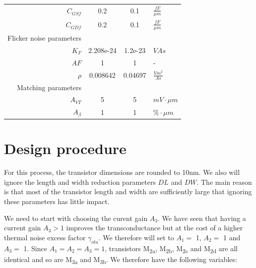 \documentclass[
  a4paper,
  DIV=11,
  numbers=noendperiod]{scrreprt}
\begin{document}
\begin{longtable}[]{@{}rccl@{}}
\(C_{{GSf}}\) & 0.2 & 0.1 & \(\frac{{fF}}{{\mu m}}\) \\
\(C_{{GDf}}\) & 0.2 & 0.1 & \(\frac{{fF}}{{\mu m}}\) \\
Flicker noise parameters & & & \\
\(K_F\) & 2.208e-24 & 1.2e-23 & \(V A s\) \\
\(AF\) & 1 & 1 & - \\
\(\rho\) & 0.008642 & 0.04697 & \(\frac{{V m^2}}{{A s}}\) \\
Matching parameters & & & \\
\(A_{{VT}}\) & 5 & 5 & \(mV \cdot \mu m\) \\
\(A_{{\beta}}\) & 1 & 1 & \(\% \cdot \mu m\) \\

\end{longtable}

\section{Design procedure}\label{design-procedure}

\begin{tcolorbox}[enhanced jigsaw, bottomrule=.15mm, colback=white, leftrule=.75mm, toprule=.15mm, opacitybacktitle=0.6, colbacktitle=quarto-callout-important-color!10!white, left=2mm, colframe=quarto-callout-important-color-frame, coltitle=black, bottomtitle=1mm, arc=.35mm, toptitle=1mm, titlerule=0mm, title=\textcolor{quarto-callout-important-color}{\faExclamation}\hspace{0.5em}{Important}, breakable, opacityback=0, rightrule=.15mm]

For this process, the transistor dimensions are rounded to 10nm. We also
will ignore the length and width reduction parameters \(DL\) and \(DW\).
The main reason is that most of the transistor length and width are
sufficiently large that ignoring these parameters has little impact.

\end{tcolorbox}

We need to start with choosing the curent gain \(A_3\). We have seen
that having a current gain \(A_3 > 1\) improves the transconductance but
at the cost of a higher thermal noise excess factor \(\gamma_{ota}\). We
therefore will set to \(A_1 =\) 1, \(A_2 =\) 1 and \(A_3 =\) 1. Since
\(A_1 = A_2 = A_3 = 1\), transistors M\textsubscript{2a},
M\textsubscript{2b}, M\textsubscript{2c} and M\textsubscript{2d} are all
identical and so are M\textsubscript{3a} and M\textsubscript{3b}. We
therefore have the following variables:
\end{document}
